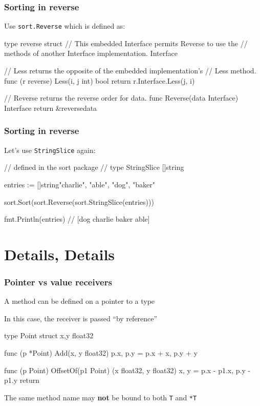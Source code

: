 \documentclass[handout,compress,t,11pt]{beamer}
\begin{document}
\begin{frame}[fragile]
    \frametitle{Sorting in reverse}
    Use \verb|sort.Reverse| which is defined as: \par
\begin{golang}
type reverse struct {
	// This embedded Interface permits Reverse to use the 
    // methods of another Interface implementation.
	Interface
}

// Less returns the opposite of the embedded implementation's 
// Less method.
func (r reverse) Less(i, j int) bool {
	return r.Interface.Less(j, i)
}

// Reverse returns the reverse order for data.
func Reverse(data Interface) Interface {
	return &reverse{data}
}
\end{golang}
\end{frame}

\begin{frame}[fragile]
    \frametitle{Sorting in reverse}
    Let's use \verb|StringSlice| again: \par
    \vspace{\baselineskip}
\begin{golang}
//  defined in the sort package
//  type StringSlice []string

entries := []string{"charlie", "able", "dog", "baker"}

sort.Sort(sort.Reverse(sort.StringSlice(entries)))

fmt.Println(entries)   // [dog charlie baker able]
\end{golang}
\end{frame}


\section{Details, Details}
\begin{frame}[fragile]
    \frametitle{Pointer vs value receivers}
    A method can be defined on a pointer to a type \par
    \vspace{0.4\baselineskip}
    In this case, the receiver is passed ``by reference''
\begin{golang}
type Point struct {
	x,y float32
}

func (p *Point) Add(x, y float32) {
	p.x, p.y = p.x + x, p.y + y
}

func (p Point) OffsetOf(p1 Point) (x float32, y float32) {
	x, y = p.x - p1.x, p.y - p1.y
	return
}
\end{golang}
The same method name may {\bf not} be bound to both \verb|T| and \verb|*T| \par
\end{frame}
\end{document}
